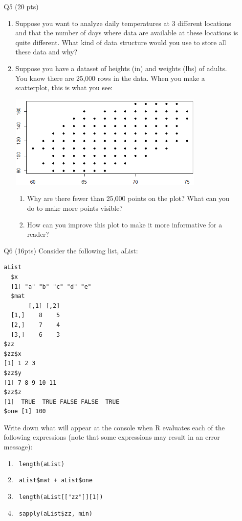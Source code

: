 \documentclass[12pt]{article}
\theoremstyle{Conjecture}
\theoremstyle{example}
\theoremstyle{remark}
\theoremstyle{lemma}
\theoremstyle{definition}
\theoremstyle{corol}
\theoremstyle{proposition}
\theoremstyle{condition}
\begin{document}
\begin{enumerate}
 \newpage

\item [Q5] (20 pts)
\begin{enumerate}
\item Suppose you want to analyze daily temperatures at 3 different
locations and that the number of days where data are available at
these locations is quite different. What kind of data structure would
you use to store all these data and why? 
\vspace{1in}
\item Suppose you have a dataset of heights (in) and weights (lbs) of adults. You know there are 25,000 rows in the data. When you make a scatterplot, this is what you see:
\begin{center}
  \includegraphics[width=0.8\textwidth]{midtermPlot.png}
\end{center}
\begin{enumerate}
  \item Why are there fewer than 25,000 points on the plot? What can you do to make more points visible?
  \vspace{1in}
  \item How can you improve this plot to make it more informative for a reader?
\end{enumerate}
\end{enumerate}

\newpage
\item[Q6] (16pts) Consider the following list, aList:
\begin{verbatim}
aList
  $x
  [1] "a" "b" "c" "d" "e"
  $mat
       [,1] [,2]
  [1,]    8    5
  [2,]    7    4
  [3,]    6    3
$zz
$zz$x
[1] 1 2 3
$zz$y
[1] 7 8 9 10 11
$zz$z
[1]  TRUE  TRUE FALSE FALSE  TRUE
$one [1] 100
\end{verbatim}
Write down what will appear at the console when R evaluates each of 
the following expressions (note that some expressions may result in 
an error message):

\begin{enumerate}
\item \verb| length(aList) |
\vspace{0.2in}
\item \verb| aList$mat + aList$one|
\vspace{0.7in}
\item \verb| length(aList[["zz"]][1])|
\vspace{0.2in}
\item \verb| sapply(aList$zz, min)|
\end{enumerate}
\end{enumerate}
\end{document}
